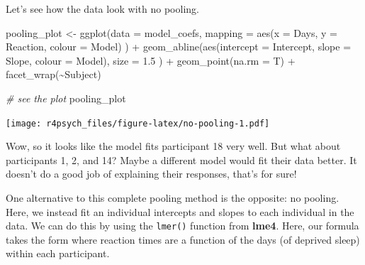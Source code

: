 \documentclass[
]{book}
\newenvironment{Shaded}{\begin{snugshade}}{\end{snugshade}}
\newcommand{\AttributeTok}[1]{\textcolor[rgb]{0.77,0.63,0.00}{#1}}
\newcommand{\CommentTok}[1]{\textcolor[rgb]{0.56,0.35,0.01}{\textit{#1}}}
\newcommand{\FloatTok}[1]{\textcolor[rgb]{0.00,0.00,0.81}{#1}}
\newcommand{\FunctionTok}[1]{\textcolor[rgb]{0.00,0.00,0.00}{#1}}
\newcommand{\NormalTok}[1]{#1}
\newcommand{\OtherTok}[1]{\textcolor[rgb]{0.56,0.35,0.01}{#1}}
\newcommand{\SpecialCharTok}[1]{\textcolor[rgb]{0.00,0.00,0.00}{#1}}
\newcommand{\StringTok}[1]{\textcolor[rgb]{0.31,0.60,0.02}{#1}}
\begin{document}
Let's see how the data look with no pooling.

\begin{Shaded}
\begin{Highlighting}[]
\NormalTok{pooling\_plot }\OtherTok{\textless{}{-}} \FunctionTok{ggplot}\NormalTok{(}\AttributeTok{data =}\NormalTok{ model\_coefs, }
       \AttributeTok{mapping =} \FunctionTok{aes}\NormalTok{(}\AttributeTok{x =}\NormalTok{ Days, }
                     \AttributeTok{y =}\NormalTok{ Reaction, }
                     \AttributeTok{colour =}\NormalTok{ Model)}
\NormalTok{       ) }\SpecialCharTok{+}
  \FunctionTok{geom\_abline}\NormalTok{(}\FunctionTok{aes}\NormalTok{(}\AttributeTok{intercept =}\NormalTok{ Intercept, }
                  \AttributeTok{slope =}\NormalTok{ Slope,}
                  \AttributeTok{colour =}\NormalTok{ Model),}
              \AttributeTok{size =} \FloatTok{1.5}
\NormalTok{              ) }\SpecialCharTok{+}
  \FunctionTok{geom\_point}\NormalTok{(}\AttributeTok{na.rm =}\NormalTok{ T) }\SpecialCharTok{+}
  \FunctionTok{facet\_wrap}\NormalTok{(}\SpecialCharTok{\textasciitilde{}}\NormalTok{Subject)}

\CommentTok{\# see the plot}
\NormalTok{pooling\_plot}
\end{Highlighting}
\end{Shaded}

\texttt{[image: r4psych\_files/figure-latex/no-pooling-1.pdf]}

Wow, so it looks like the model fits participant 18 very well. But what about participants 1, 2, and 14? Maybe a different model would fit their data better. It doesn't do a good job of explaining their responses, that's for sure!

One alternative to this complete pooling method is the opposite: no pooling. Here, we instead fit an individual intercepts and slopes to each individual in the data. We can do this by using the \texttt{lmer()} function from \textbf{lme4}. Here, our formula takes the form where reaction times are a function of the days (of deprived sleep) within each participant.

\begin{Shaded}
\end{Shaded}
\end{document}
